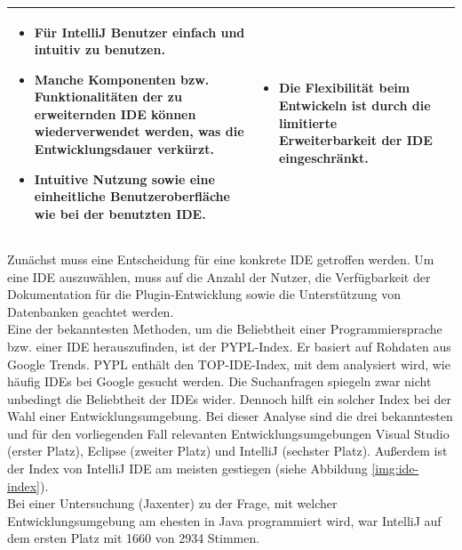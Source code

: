 \begin{table}
\begin{tabular}{ |p{3cm}|p{6cm}|p{6cm}| }
		\begin{itemize}
			\item Für IntelliJ Benutzer  einfach und intuitiv zu benutzen.
			\item Manche Komponenten bzw. Funktionalitäten der zu erweiternden IDE können wiederverwendet werden, was die Entwicklungsdauer verkürzt.
			\item Intuitive Nutzung sowie eine einheitliche Benutzeroberfläche wie bei der benutzten IDE.
		\end{itemize} &
		
		\begin{itemize}
			\item Die Flexibilität beim Entwickeln ist durch die limitierte Erweiterbarkeit der IDE eingeschränkt.
		\end{itemize} \\
		\hline
		
	\end{tabular}
	\label{table:tool-options}
\end{table}

Zunächst muss eine Entscheidung für eine konkrete IDE getroffen werden. Um eine IDE auszuwählen, muss auf die Anzahl der Nutzer, die Verfügbarkeit der Dokumentation für die Plugin-Entwicklung sowie die Unterstützung von Datenbanken geachtet werden.\\
Eine der bekanntesten Methoden, um die Beliebtheit einer Programmiersprache bzw. einer IDE herauszufinden, ist der PYPL-Index. Er basiert auf Rohdaten aus Google Trends. PYPL enthält den TOP-IDE-Index, mit dem analysiert wird, wie häufig IDEs bei Google gesucht werden. Die Suchanfragen spiegeln zwar nicht unbedingt die Beliebtheit der IDEs wider. Dennoch hilft ein solcher Index bei der Wahl einer Entwicklungsumgebung. Bei dieser Analyse sind die drei bekanntesten und für den vorliegenden Fall relevanten Entwicklungsumgebungen Visual Studio (erster Platz), Eclipse (zweiter Platz) und IntelliJ (sechster Platz). Außerdem ist der Index von IntelliJ IDE am meisten gestiegen (siehe Abbildung \ref{img:ide-index}).\\
Bei einer Untersuchung (Jaxenter) zu der Frage, mit welcher Entwicklungsumgebung am ehesten in Java programmiert wird, war IntelliJ auf dem ersten Platz mit 1660 von 2934 Stimmen.

